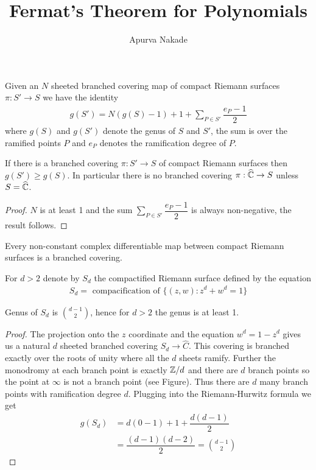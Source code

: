 



\DeclareMathOperator{\re}{Re}




\title{Fermat's Theorem for Polynomials}
\author{Apurva Nakade}
\thispagestyle{fancy}
\maketitle


\begin{thm}
	Given an $N$ sheeted branched covering map of compact Riemann surfaces $\pi:S' \rightarrow S$ we have the identity
	\begin{align}
		g(S') = N(g(S) - 1) + 1 + \sum \limits_{P \in S'} \dfrac{e_P - 1}{2}
	\end{align}
	where $g(S)$ and $g(S')$ denote the genus of $S$ and $S'$, the sum is over the ramified points $P$ and $e_P$ denotes the ramification degree of $P$.
\end{thm}

\begin{cor}
	\label{thm:thm1}
	If there is a branched covering $\pi: S' \rightarrow S$ of compact Riemann surfaces then $g(S') \ge g(S)$. In particular there is no branched covering $\pi: \widehat {\mathbb{C}} \rightarrow S$ unless $S = \widehat {\mathbb{C}}$.
\end{cor}
\begin{proof}
	$N$ is at least 1 and the sum $\sum_{P \in S'} \dfrac{e_P - 1}{2}$ is always non-negative, the result follows.
\end{proof}

\begin{thm}
	Every non-constant complex differentiable map between compact Riemann surfaces is a branched covering.
\end{thm}

For $d>2$ denote by $S_d$ the compactified Riemann surface defined by the equation
\begin{align}
	S_d = \mbox{ compacification of } \{ (z,w): z^d + w^d = 1\}
\end{align}
\begin{lem}
	\label{thm:thm2}
	Genus of $S_d$ is ${d-1 \choose 2}$, hence for $d>2$ the genus is at least 1.
\end{lem}
\begin{proof}
	The projection onto the $z$ coordinate and the equation $w^d = 1 - z^d $ gives us a natural $d$ sheeted branched covering $S_d \rightarrow \widehat C$. This covering is branched exactly over the roots of unity where all the $d$ sheets ramify. Further the monodromy at each branch point is exactly $\mathbb{Z}/d$ and there are $d$ branch points so the point at $\infty$ is not a branch point (see Figure). Thus there are $d$ many branch points with ramification degree $d$. Plugging into the Riemann-Hurwitz formula we get
	\begin{align}
		g(S_d) & = d(0 - 1) + 1 + \dfrac{d(d - 1)}{2}      \\
		       & = \dfrac{(d-1)(d-2)}{2} = {d-1 \choose 2}
	\end{align}
\end{proof}

